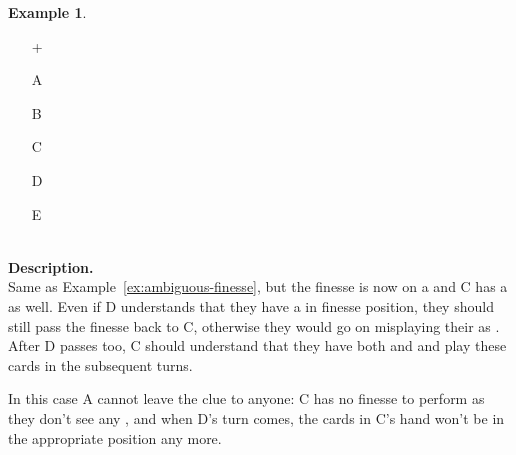 \documentclass[a4paper]{article}
\theoremstyle{plain}
\theoremstyle{definition}
\newtheorem{example}[theorem]{Example}
\begin{document}
\begin{example}	\hfill \\
	\begin{minipage}{0.45\textwidth}
		\begin{itemize}
			\item[\Large +]      
			\item[\Large A]    
			\item[\Large B]    
			\item[\Large C]     
			\item[\Large D]    
			\item[\Large E]    
		\end{itemize}
	\end{minipage}%
	\begin{minipage}{0.55\textwidth}
		\hfill \\
		
		\textbf{Description.} \\
		
		Same as Example~\ref{ex:ambiguous-finesse}, but the finesse is now on a  and C has a  as well. Even if D understands that they have a  in finesse position, they should still pass the finesse back to C, otherwise they would go on misplaying their  as . After D passes too, C should understand that they have both  and  and play these cards in the subsequent turns.
		
		In this case A cannot leave the clue to anyone: C has no finesse to perform as they don't see any , and when D's turn comes, the cards in C's hand won't be in the appropriate position any more.
	\end{minipage}
\end{example} \vspace{0.15 cm}
\end{document}

